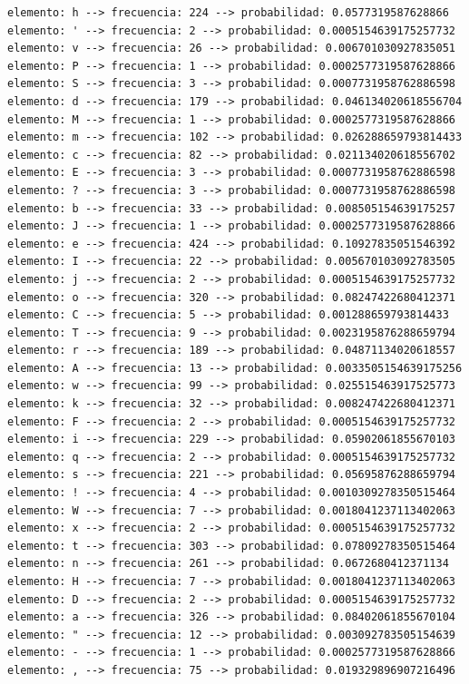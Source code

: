 \documentclass[10pt]{article}
\begin{document}
\begin{verbatim}
elemento: h --> frecuencia: 224 --> probabilidad: 0.0577319587628866
elemento: ' --> frecuencia: 2 --> probabilidad: 0.0005154639175257732
elemento: v --> frecuencia: 26 --> probabilidad: 0.006701030927835051
elemento: P --> frecuencia: 1 --> probabilidad: 0.0002577319587628866
elemento: S --> frecuencia: 3 --> probabilidad: 0.0007731958762886598
elemento: d --> frecuencia: 179 --> probabilidad: 0.046134020618556704
elemento: M --> frecuencia: 1 --> probabilidad: 0.0002577319587628866
elemento: m --> frecuencia: 102 --> probabilidad: 0.026288659793814433
elemento: c --> frecuencia: 82 --> probabilidad: 0.021134020618556702
elemento: E --> frecuencia: 3 --> probabilidad: 0.0007731958762886598
elemento: ? --> frecuencia: 3 --> probabilidad: 0.0007731958762886598
elemento: b --> frecuencia: 33 --> probabilidad: 0.008505154639175257
elemento: J --> frecuencia: 1 --> probabilidad: 0.0002577319587628866
elemento: e --> frecuencia: 424 --> probabilidad: 0.10927835051546392
elemento: I --> frecuencia: 22 --> probabilidad: 0.005670103092783505
elemento: j --> frecuencia: 2 --> probabilidad: 0.0005154639175257732
elemento: o --> frecuencia: 320 --> probabilidad: 0.08247422680412371
elemento: C --> frecuencia: 5 --> probabilidad: 0.001288659793814433
elemento: T --> frecuencia: 9 --> probabilidad: 0.0023195876288659794
elemento: r --> frecuencia: 189 --> probabilidad: 0.04871134020618557
elemento: A --> frecuencia: 13 --> probabilidad: 0.0033505154639175256
elemento: w --> frecuencia: 99 --> probabilidad: 0.025515463917525773
elemento: k --> frecuencia: 32 --> probabilidad: 0.008247422680412371
elemento: F --> frecuencia: 2 --> probabilidad: 0.0005154639175257732
elemento: i --> frecuencia: 229 --> probabilidad: 0.05902061855670103
elemento: q --> frecuencia: 2 --> probabilidad: 0.0005154639175257732
elemento: s --> frecuencia: 221 --> probabilidad: 0.05695876288659794
elemento: ! --> frecuencia: 4 --> probabilidad: 0.0010309278350515464
elemento: W --> frecuencia: 7 --> probabilidad: 0.0018041237113402063
elemento: x --> frecuencia: 2 --> probabilidad: 0.0005154639175257732
elemento: t --> frecuencia: 303 --> probabilidad: 0.07809278350515464
elemento: n --> frecuencia: 261 --> probabilidad: 0.0672680412371134
elemento: H --> frecuencia: 7 --> probabilidad: 0.0018041237113402063
elemento: D --> frecuencia: 2 --> probabilidad: 0.0005154639175257732
elemento: a --> frecuencia: 326 --> probabilidad: 0.08402061855670104
elemento: " --> frecuencia: 12 --> probabilidad: 0.003092783505154639
elemento: - --> frecuencia: 1 --> probabilidad: 0.0002577319587628866
elemento: , --> frecuencia: 75 --> probabilidad: 0.019329896907216496

\end{verbatim}
\end{document}
